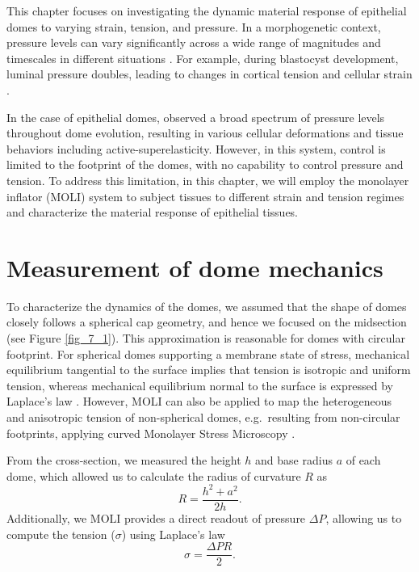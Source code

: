 This chapter focuses on investigating the dynamic material response of epithelial domes to varying strain, tension, and pressure. In a morphogenetic context, pressure levels can vary significantly across a wide range of magnitudes and timescales in different situations \cite{torres-sanchez2021, choudhury2022a}. For example, during blastocyst development, luminal pressure doubles, leading to changes in cortical tension and cellular strain \cite{chan2019}.

In the case of epithelial domes, \citet{latorre2018} observed a broad spectrum of pressure levels throughout dome evolution, resulting in various cellular deformations and tissue behaviors including active-superelasticity. However, in this system, control is limited to the footprint of the domes, with no capability to control pressure and tension. To address this limitation, in this chapter, we will employ the monolayer inflator (MOLI) system to subject tissues to different strain and tension regimes and characterize the material response of epithelial tissues.

\hypertarget{measurement-of-dome-mechanics}{%
	\section{Measurement of dome mechanics}\label{measurement-of-dome-mechanics}}

To characterize the dynamics of the domes, we assumed that the shape of domes closely follows a spherical cap geometry, and hence we focused on the midsection (see Figure \ref{fig_7_1}). This  approximation is reasonable for domes with circular footprint. For spherical domes  supporting a membrane state of stress, mechanical equilibrium tangential to the surface implies that tension is isotropic and uniform tension, whereas mechanical equilibrium normal to the surface is expressed by Laplace's law \cite{latorre2018}. However, MOLI can also be applied to map the  heterogeneous and anisotropic tension of non-spherical domes, e.g.~resulting from non-circular footprints, applying curved Monolayer Stress Microscopy \cite{marin-llaurado2022}.

From the cross-section, we measured the height $h$ and base radius $a$ of each dome, which allowed us to calculate the radius of curvature $R$ as
\begin{equation}
	\label{eqn:radiuscurve}
	R = \frac{h^2 + a^2}{2h}.
\end{equation}
Additionally, we MOLI provides a direct readout of pressure $\Delta P$, allowing us to compute the tension ($\sigma$) using Laplace's law
\begin{equation}
	\label{eqn:laplace}
	\sigma = \frac{\Delta PR }{2} .
\end{equation}

